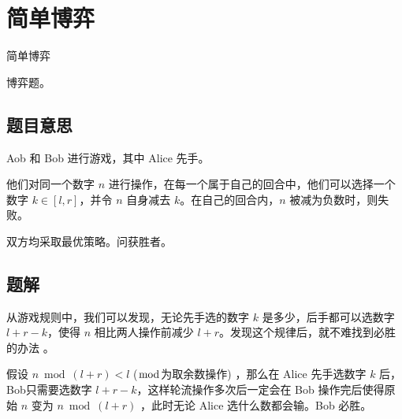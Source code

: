 \def\sectionName{简单博弈}
\section[\TOCName]{\sectionName}



\begin{frame}

\isBeamerMode\relax
    {\Huge \sectionName}\par
\fi




博弈题。



\end{frame}

\subsection{题目意思}
\begin{frame} %
Aob 和 Bob 进行游戏，其中 Alice 先手。

他们对同一个数字 $n$ 进行操作，在每一个属于自己的回合中，他们可以选择一个数字 $k
\in [l, r]$，并令 $n$ 自身减去 $k$。在自己的回合内，$n$ 被减为负数时，则失败。

双方均采取最优策略。问获胜者。
\end{frame}



\subsection{题解}
\begin{frame} %
从游戏规则中，我们可以发现，无论先手选的数字 $k$ 是多少，后手都可以选数字 $l + r
- k$，使得 $n$ 相比两人操作前减少 $l + r$。发现这个规律后，就不难找到必胜的办法
。

假设 $n \bmod (l + r) < l$  ($\bmod$为取余数操作) ，那么在 Alice 先手选数字 $k$
后，Bob只需要选数字 $l + r - k$，这样轮流操作多次后一定会在 Bob 操作完后使得原始
$n$ 变为 $n \bmod (l + r)$ ，此时无论 Alice 选什么数都会输。Bob 必胜。
\end{frame}


